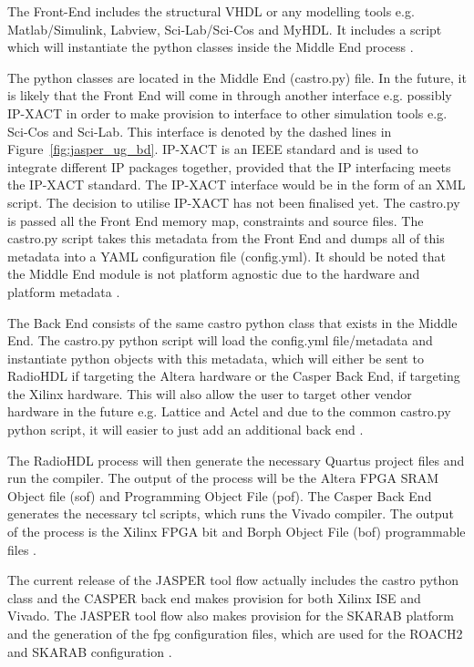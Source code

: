 \documentclass{ws-jai}
\begin{document}
The Front-End includes the structural VHDL or any modelling tools e.g. Matlab/Simulink, Labview, Sci-Lab/Sci-Cos and MyHDL. It includes a script which will instantiate the python classes inside the Middle End process \cite{Isaac16}. 

The python classes are located in the Middle End (castro.py) file. In the future, it is likely that the Front End will come in through another interface e.g. possibly IP-XACT in order to make provision to interface to other simulation tools e.g. Sci-Cos and Sci-Lab. This interface is denoted by the dashed lines in Figure~\ref{fig:jasper_ug_bd}. IP-XACT is an IEEE standard and is used to integrate different IP packages together, provided that the IP interfacing meets the IP-XACT standard. The IP-XACT interface would be in the form of an XML script. The decision to utilise IP-XACT has not been finalised yet. The castro.py is passed all the Front End memory map, constraints and source files. The castro.py script takes this metadata from the Front End and dumps all of this metadata into a YAML configuration file (config.yml). It should be noted that the Middle End module is not platform agnostic due to the hardware and platform metadata \cite{Isaac16}.

The Back End consists of the same castro python class that exists in the Middle End. The castro.py python script will load the config.yml file/metadata and instantiate python objects with this metadata, which will either be sent to RadioHDL if targeting the Altera hardware or the Casper Back End, if targeting the Xilinx hardware. This will also allow the user to target other vendor hardware in the future e.g. Lattice and Actel and due to the common castro.py python script, it will easier to just add an additional back end \cite{Isaac16}. 

The RadioHDL process will then generate the necessary Quartus project files and run the compiler. The output of the process will be the Altera FPGA SRAM Object file (sof) and Programming Object File (pof). The Casper Back End generates the necessary tcl scripts, which runs the Vivado compiler. The output of the process is the Xilinx FPGA bit and Borph Object File (bof) programmable files \cite{Isaac16}.

The current release of the JASPER tool flow actually includes the castro python class and the CASPER back end makes provision for both Xilinx ISE and Vivado. The JASPER tool flow also makes provision for the SKARAB platform and the generation of the fpg configuration files, which are used for the ROACH2 and SKARAB configuration \cite{Balla16}.
\end{document}
